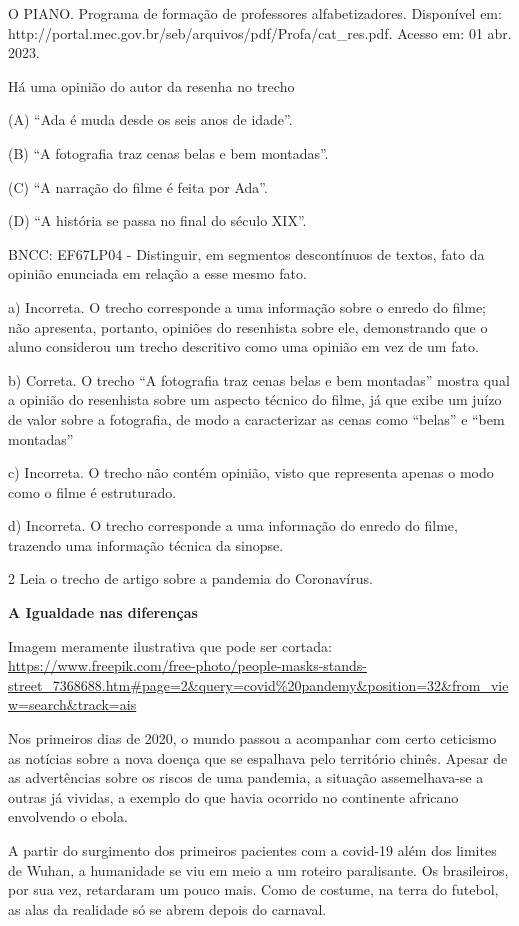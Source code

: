 \begin{itemize}
\begin{itemize}
O PIANO. Programa de formação de professores alfabetizadores. Disponível
em: http://portal.mec.gov.br/seb/arquivos/pdf/Profa/cat\_res.pdf. Acesso
em: 01 abr. 2023.

Há uma opinião do autor da resenha no trecho

(A) ``Ada é muda desde os seis anos de idade''.

(B) ``A fotografia traz cenas belas e bem montadas''.

(C) ``A narração do filme é feita por Ada''.

(D) ``A história se passa no final do século XIX''.

BNCC: EF67LP04 - Distinguir, em segmentos descontínuos de textos, fato
da opinião enunciada em relação a esse mesmo fato.

a) Incorreta. O trecho corresponde a uma informação sobre o enredo do
filme; não apresenta, portanto, opiniões do resenhista sobre ele,
demonstrando que o aluno considerou um trecho descritivo como uma
opinião em vez de um fato.

b) Correta. O trecho ``A fotografia traz cenas belas e bem montadas''
mostra qual a opinião do resenhista sobre um aspecto técnico do filme,
já que exibe um juízo de valor sobre a fotografia, de modo a
caracterizar as cenas como ``belas'' e ``bem montadas''

c) Incorreta. O trecho não contém opinião, visto que representa apenas o
modo como o filme é estruturado.

d) Incorreta. O trecho corresponde a uma informação do enredo do filme,
trazendo uma informação técnica da sinopse.

\num{2} Leia o trecho de artigo sobre a pandemia do Coronavírus.

\textbf{A Igualdade nas diferenças}

Imagem meramente ilustrativa que pode ser cortada:
\url{https://www.freepik.com/free-photo/people-masks-stands-street_7368688.htm\#page=2\&query=covid\%20pandemy\&position=32\&from_view=search\&track=ais}

Nos primeiros dias de 2020, o mundo passou a acompanhar com certo
ceticismo as notícias sobre a nova doença que se espalhava pelo
território chinês. Apesar de as advertências sobre os riscos de uma
pandemia, a situação assemelhava-se a outras já vividas, a exemplo do
que havia ocorrido no continente africano envolvendo o ebola.

A partir do surgimento dos primeiros pacientes com a covid-19 além dos
limites de Wuhan, a humanidade se viu em meio a um roteiro paralisante.
Os brasileiros, por sua vez, retardaram um pouco mais. Como de costume,
na terra do futebol, as alas da realidade só se abrem depois do
carnaval.


\end{itemize}
\end{itemize}
